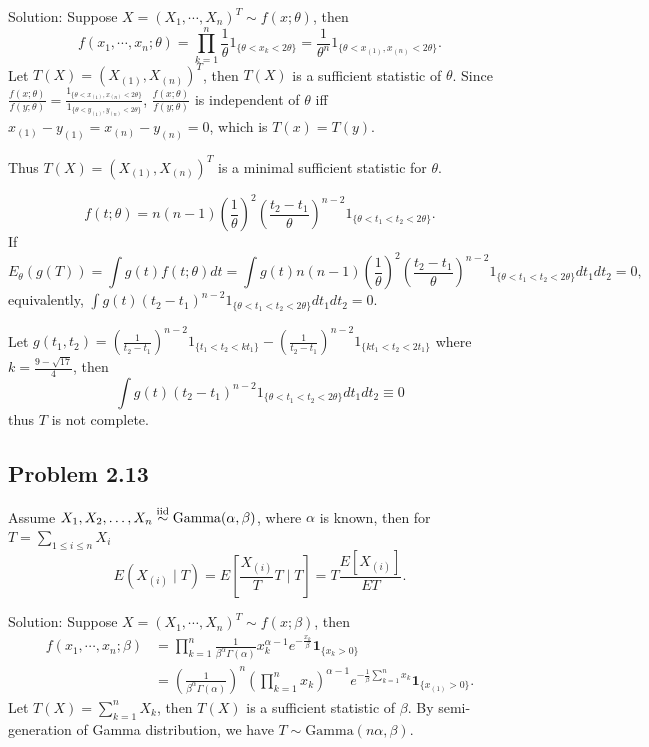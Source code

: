 {Solution:}
Suppose $X=(X_{1},\cdots,X_{n})^{T}\sim f(x;\theta)$, then
\[
f\left(x_{1},\cdots,x_{n};\theta\right)=\prod_{k=1}^{n}\frac{1}{\theta}1_{\{\theta<x_{k}<2\theta\}}=\frac{1}{\theta^{n}}1_{\{\theta<x_{(1)},x_{(n)}<2\theta\}}.
\]
Let $T(X)=\left(X_{(1)},X_{(n)}\right)^{T}$, then $T(X)$ is a sufficient statistic of $\theta$. Since $\frac{f(x;\theta)}{f(y;\theta)}=\frac{1_{\{\theta<x_{(1)},x_{(n)}<2\theta\}}}{1_{\{\theta<y_{(1)},y_{(n)}<2\theta\}}}$, $\frac{f(x;\theta)}{f(y;\theta)}$ is independent of $\theta$ iff $x_{(1)}-y_{(1)}=x_{(n)}-y_{(n)}=0$, which is $T(x)=T(y)$.

Thus $T(X)=\left(X_{(1)},X_{(n)}\right)^{T}$ is a minimal sufficient statistic for $\theta$.

\[
f(t;\theta)=n(n-1)\left(\frac{1}{\theta}\right)^{2}\left(\frac{t_{2}-t_{1}}{\theta}\right)^{n-2}1_{\{\theta<t_{1}<t_{2}<2\theta\}}.
\]
If
\[
E_{\theta}(g(T))=\int g(t)f(t;\theta)dt=\int g(t)n(n-1)\left(\frac{1}{\theta}\right)^{2}\left(\frac{t_{2}-t_{1}}{\theta}\right)^{n-2}1_{\{\theta<t_{1}<t_{2}<2\theta\}}dt_{1}dt_{2}=0,
\]
equivalently, $\int g(t)\left(t_{2}-t_{1}\right)^{n-2}1_{\{\theta<t_{1}<t_{2}<2\theta\}}dt_{1}dt_{2}=0$.

Let $g\left(t_{1},t_{2}\right)=\left(\frac{1}{t_{2}-t_{1}}\right)^{n-2}1_{\{t_{1}<t_{2}<kt_{1}\}}-\left(\frac{1}{t_{2}-t_{1}}\right)^{n-2}1_{\{kt_{1}<t_{2}<2t_{1}\}}$ where $k=\frac{9-\sqrt{17}}{4}$, then
\[
\int g(t)\left(t_{2}-t_{1}\right)^{n-2}1_{\{\theta<t_{1}<t_{2}<2\theta\}}dt_{1}dt_{2}\equiv 0
\]
thus $T$ is not complete.

\subsection*{Problem 2.13}
Assume $X_{1},X_{2},\ldots,X_{n}\stackrel{\rm iid}{\sim}\text{Gamma}(\alpha,\beta)$, where $\alpha$ is known, then for $T=\sum_{1\leq i\leq n}X_{i}$
\[
E\left(X_{(i)}\mid T\right)=E\left[\frac{X_{(i)}}{T}T\mid T\right]=T\frac{E\left[X_{(i)}\right]}{ET}.
\]

{Solution:}
Suppose $X=(X_{1},\cdots,X_{n})^{T}\sim f(x;\beta)$, then
\begin{align*}
f(x_{1},\cdots,x_{n};\beta)&=\prod_{k=1}^{n}\frac{1}{\beta^{\alpha}\Gamma(\alpha)}x_{k}^{\alpha-1}e^{-\frac{x_{k}}{\beta}}\mathbf{1}_{\{x_{k}>0\}}\\
&=\left(\frac{1}{\beta^{\alpha}\Gamma(\alpha)}\right)^{n}\left(\prod_{k=1}^{n}x_{k}\right)^{\alpha-1}e^{-\frac{1}{\beta}\sum_{k=1}^{n}x_{k}}\mathbf{1}_{\{x_{(1)}>0\}}.
\end{align*}
Let $T(X)=\sum_{k=1}^{n}X_{k}$, then $T(X)$ is a sufficient statistic of $\beta$. By semi-generation of Gamma distribution, we have $T\sim\text{Gamma}(n\alpha,\beta)$.

